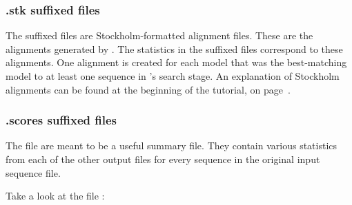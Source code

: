 \subsubsection{.stk suffixed files}
The  suffixed files are Stockholm-formatted alignment
files. These are the alignments generated by . The
statistics in the  suffixed files correspond to these
alignments. One alignment is created for each model that was the
best-matching model to at least one sequence in 's
search stage. An explanation of Stockholm alignments can be found at
the beginning of the tutorial, on page~\pageref{sec:tutorial-stk}.

\subsubsection{.scores suffixed files}

The  file are meant to be a useful summary file.
They contain various statistics from each of the other output files
for every sequence in the original input sequence file. 

Take a look at the file :

